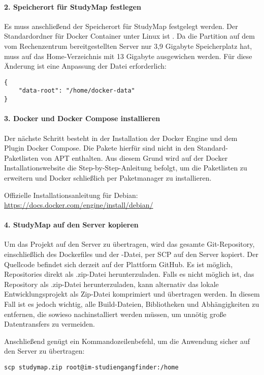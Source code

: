 \paragraph*{2. Speicherort für StudyMap festlegen}
Es muss anschließend der Speicherort für StudyMap festgelegt werden. Der Standardordner für Docker Container unter Linux ist . Da die Partition auf dem vom Rechenzentrum bereitgestellten Server nur 3,9 Gigabyte Speicherplatz hat, muss auf das Home-Verzeichnis mit 13 Gigabyte ausgewichen werden. Für diese Änderung ist eine Anpassung der Datei  erforderlich:
\begin{lstlisting}[style=Python]
{
    "data-root": "/home/docker-data"
}
\end{lstlisting}

\paragraph*{3. Docker und Docker Compose installieren}
Der nächste Schritt besteht in der Installation der Docker Engine und dem Plugin Docker Compose. Die Pakete hierfür sind nicht in den Standard-Paketlisten von APT enthalten. Aus diesem Grund wird auf der Docker Installationswebsite die Step-by-Step-Anleitung befolgt, um die Paketlisten zu erweitern und Docker schließlich per Paketmanager zu installieren.

\noindent
Offizielle Installationsanleitung für Debian: \url{https://docs.docker.com/engine/install/debian/}

\paragraph*{4. StudyMap auf den Server kopieren}
Um das Projekt auf den Server zu übertragen, wird das gesamte Git-Repository, einschließlich des Dockerfiles und der -Datei, per SCP auf den Server kopiert. Der Quellcode befindet sich derzeit auf der Plattform GitHub. Es ist möglich, Repositories direkt als .zip-Datei herunterzuladen. Falls es nicht möglich ist, das Repository als .zip-Datei herunterzuladen, kann alternativ das lokale Entwicklungsprojekt als Zip-Datei komprimiert und übertragen werden. In diesem Fall ist es jedoch wichtig, alle Build-Dateien, Bibliotheken und Abhängigkeiten zu entfernen, die sowieso nachinstalliert werden müssen, um unnötig große Datentransfers zu vermeiden.

Anschließend genügt ein Kommandozeilenbefehl, um die Anwendung sicher auf den Server zu übertragen:
\begin{lstlisting}[style=Python]
scp studymap.zip root@im-studiengangfinder:/home
\end{lstlisting}

